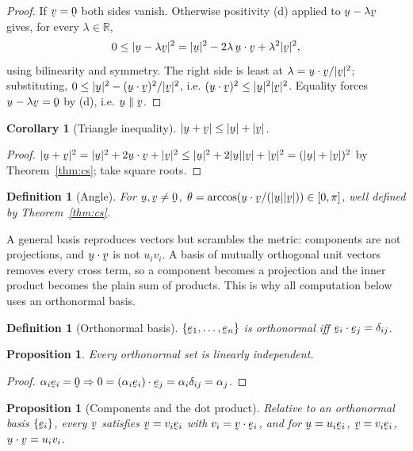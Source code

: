 \documentclass[17pt,a4paper]{extreport}
\DeclareRobustCommand{\vek}[1]{\underaccent{\tilde}{#1}}
\newcommand{\Rn}{\mathbb{R}}
\newcommand{\bu}{\vek{u}}
\newcommand{\bv}{\vek{v}}
\newcommand{\be}{\vek{e}}
\newcommand{\bze}{\vek{0}}
\newcommand{\dd}{\delta}
\newcommand{\ip}[2]{#1\cdot#2}
\theoremstyle{scplain}
\newtheorem{proposition}[theorem]{Proposition}
\newtheorem{corollary}[theorem]{Corollary}
\theoremstyle{scdefn}
\newtheorem{definition}[theorem]{Definition}
\theoremstyle{scplain}
\begin{document}
\begin{proof}
If $\bv=\bze$ both sides vanish. Otherwise positivity (d) applied to
$\bu-\lambda\bv$ gives, for every $\lambda\in\Rn$,
\[
0\le|\bu-\lambda\bv|^{2}=|\bu|^{2}-2\lambda\,\ip\bu\bv+\lambda^{2}|\bv|^{2},
\]
using bilinearity and symmetry. The right side is least at
$\lambda=\ip\bu\bv/|\bv|^{2}$; substituting,
$0\le|\bu|^{2}-(\ip\bu\bv)^{2}/|\bv|^{2}$, i.e.
$(\ip\bu\bv)^{2}\le|\bu|^{2}|\bv|^{2}$. Equality forces
$\bu-\lambda\bv=\bze$ by (d), i.e. $\bu\parallel\bv$.
\end{proof}

\begin{corollary}[Triangle inequality]\label{cor:tri}
$|\bu+\bv|\le|\bu|+|\bv|$.
\end{corollary}

\begin{proof}
$|\bu+\bv|^{2}=|\bu|^{2}+2\ip\bu\bv+|\bv|^{2}
\le|\bu|^{2}+2|\bu||\bv|+|\bv|^{2}=(|\bu|+|\bv|)^{2}$ by
Theorem~\ref{thm:cs}; take square roots.
\end{proof}

\begin{definition}[Angle]\label{def:angle}
For $\bu,\bv\neq\bze$, $\theta=\arccos(\ip\bu\bv/(|\bu||\bv|))\in[0,\pi]$,
well defined by Theorem~\ref{thm:cs}.
\end{definition}

A general basis reproduces vectors but scrambles the metric: components are
not projections, and $\ip\bu\bv$ is not $u_iv_i$. A basis of mutually
orthogonal unit vectors removes every cross term, so a component becomes a
projection and the inner product becomes the plain sum of products. This is
why all computation below uses an orthonormal basis.

\begin{definition}[Orthonormal basis]\label{def:onb}
$\{\be_{1},\dots,\be_{n}\}$ is orthonormal iff
$\ip{\be_{i}}{\be_{j}}=\dd_{ij}$.
\end{definition}

\begin{proposition}\label{prop:onlindep}
Every orthonormal set is linearly independent.
\end{proposition}

\begin{proof}
$\alpha_{i}\be_{i}=\bze\Rightarrow
0=\ip{(\alpha_{i}\be_{i})}{\be_{j}}=\alpha_{i}\dd_{ij}=\alpha_{j}$.
\end{proof}

\begin{proposition}[Components and the dot product]\label{prop:comp}
Relative to an orthonormal basis $\{\be_{i}\}$, every $\bv$ satisfies
$\bv=v_{i}\be_{i}$ with $v_{i}=\ip\bv{\be_{i}}$, and for
$\bu=u_{i}\be_{i}$, $\bv=v_{i}\be_{i}$, $\ip\bu\bv=u_{i}v_{i}$.
\end{proposition}
\end{document}
